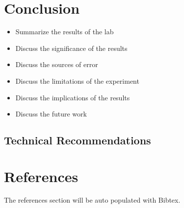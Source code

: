 \section{Conclusion}
\begin{itemize}
    \item Summarize the results of the lab
    \item Discuss the significance of the results
    \item Discuss the sources of error
    \item Discuss the limitations of the experiment
    \item Discuss the implications of the results
    \item Discuss the future work
\end{itemize}
\subsection{Technical Recommendations}

\newpage
\section{References}
The references section will be auto populated with Bibtex.

